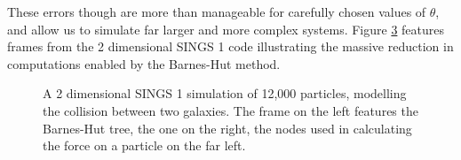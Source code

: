 \documentclass[12pt, twoside, letterpaper]{article}
\begin{document}
These errors though are more than manageable for carefully chosen values of $\theta$, and allow us to simulate far larger and more complex systems. Figure \ref{fig:sings1bh} features frames from the 2 dimensional SINGS 1 code illustrating the massive reduction in computations enabled by the Barnes-Hut method.

\begin{figure}
\centering
\setlength{\fboxsep}{0pt}
\setlength{\fboxrule}{1.25pt}
\begin{subfigure}[t]{.45\textwidth}
  \centering
  \label{fig:sub1}
\end{subfigure}%
\setlength{\fboxsep}{0.1pt}
\setlength{\fboxrule}{1.25pt}
\begin{subfigure}[t]{.45\textwidth}
  \centering
  \label{fig:sub2}
\end{subfigure}
\caption{A 2 dimensional SINGS 1 simulation of 12,000 particles, modelling the collision between two galaxies. The frame on the left features the Barnes-Hut tree, the one on the right, the nodes used in calculating the force on a particle on the far left.}
\label{fig:sings1bh}
\end{figure}
\end{document}
